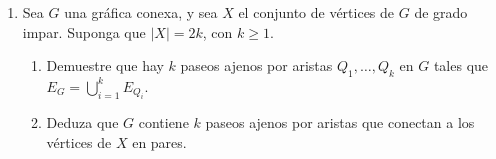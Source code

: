 \documentclass{article}
\begin{document}
\begin{enumerate}
\item Sea $G$ una gr\'afica conexa, y sea $X$ el conjunto
  de v\'ertices de $G$ de grado impar.   Suponga que
  $|X| = 2k$, con $k \ge 1$.
  \begin{enumerate}
  \item Demuestre que hay $k$ paseos ajenos por
    aristas $Q_1, \dots, Q_k$ en $G$ tales que
    $E_G = \bigcup_{i=1}^k E_{Q_i}$.

  \item Deduza que $G$ contiene $k$ paseos ajenos
    por aristas que conectan a los v\'ertices de $X$
    en pares.
  \end{enumerate}
\end{enumerate}
\end{document}

